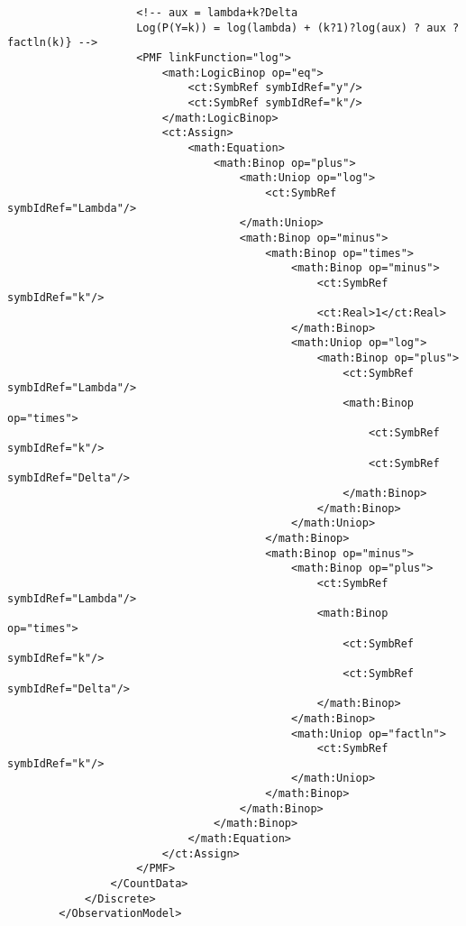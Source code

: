\begin{lstlisting}
                    <!-- aux = lambda+k?Delta
                    Log(P(Y=k)) = log(lambda) + (k?1)?log(aux) ? aux ? factln(k)} -->
                    <PMF linkFunction="log">
                        <math:LogicBinop op="eq">
                            <ct:SymbRef symbIdRef="y"/>
                            <ct:SymbRef symbIdRef="k"/>
                        </math:LogicBinop>
                        <ct:Assign>
                            <math:Equation>
                                <math:Binop op="plus">
                                    <math:Uniop op="log">
                                        <ct:SymbRef symbIdRef="Lambda"/>
                                    </math:Uniop>
                                    <math:Binop op="minus">
                                        <math:Binop op="times">
                                            <math:Binop op="minus">
                                                <ct:SymbRef symbIdRef="k"/>
                                                <ct:Real>1</ct:Real>
                                            </math:Binop>
                                            <math:Uniop op="log">
                                                <math:Binop op="plus">
                                                    <ct:SymbRef symbIdRef="Lambda"/>
                                                    <math:Binop op="times">
                                                        <ct:SymbRef symbIdRef="k"/>
                                                        <ct:SymbRef symbIdRef="Delta"/>
                                                    </math:Binop>
                                                </math:Binop>
                                            </math:Uniop>
                                        </math:Binop>
                                        <math:Binop op="minus">
                                            <math:Binop op="plus">
                                                <ct:SymbRef symbIdRef="Lambda"/>
                                                <math:Binop op="times">
                                                    <ct:SymbRef symbIdRef="k"/>
                                                    <ct:SymbRef symbIdRef="Delta"/>
                                                </math:Binop>
                                            </math:Binop>
                                            <math:Uniop op="factln">
                                                <ct:SymbRef symbIdRef="k"/>
                                            </math:Uniop>
                                        </math:Binop>
                                    </math:Binop>
                                </math:Binop>
                            </math:Equation>
                        </ct:Assign>
                    </PMF>
                </CountData>
            </Discrete>
        </ObservationModel>
\end{lstlisting}


